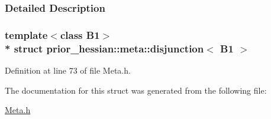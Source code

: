 \subsubsection{Detailed Description}
\subsubsection*{template$<$class B1$>$\\*
struct prior\+\_\+hessian\+::meta\+::disjunction$<$ B1 $>$}



Definition at line 73 of file Meta.\+h.



The documentation for this struct was generated from the following file\+:\begin{DoxyCompactItemize}
\item 
\hyperlink{Meta_8h}{Meta.\+h}\end{DoxyCompactItemize}

